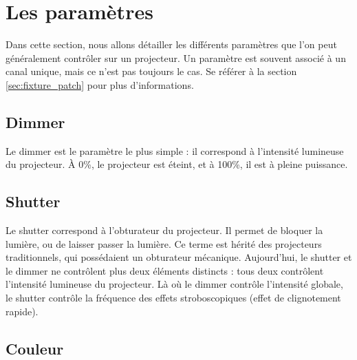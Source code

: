 \section{Les paramètres}
\label{sec:param}

Dans cette section, nous allons détailler les différents paramètres que l'on peut généralement contrôler sur un projecteur.
Un paramètre est souvent associé à un canal unique, mais ce n'est pas toujours le cas. Se référer à la section \ref{sec:fixture_patch} pour plus d'informations.

\subsection{Dimmer}
\label{subsec:param_dimmer}

Le dimmer est le paramètre le plus simple : il correspond à l'intensité lumineuse du projecteur. À 0\%, le projecteur est éteint, et à 100\%, il est à pleine puissance.

\subsection{Shutter}
\label{subsec:param_shutter}

Le shutter correspond à l'obturateur du projecteur. Il permet de bloquer la lumière, ou de laisser passer la lumière. Ce terme est hérité des projecteurs traditionnels, qui possédaient un obturateur mécanique.
Aujourd'hui, le shutter et le dimmer ne contrôlent plus deux éléments distincts : tous deux contrôlent l'intensité lumineuse du projecteur. Là où le dimmer contrôle l'intensité globale, le shutter contrôle la fréquence des effets stroboscopiques (effet de clignotement rapide).

\subsection{Couleur}
\label{subsec:param_couleur}

